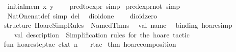 \begin{isabellebody}
{}\ {}initial{}mem\ x\ y\ {}\ {}\ {}{}\isanewline
\isanewline
{}\isamarkupfalse%
\ pred{}to{}expr\ {}simp{}\isanewline
{}\isamarkupfalse%
\ pred{}expr{}not\ {}simp{}\isanewline
{}\isamarkupfalse%
\ Nat{}One{}nat{}def\ {}simp\ del{}\isanewline
\isanewline
{}\isamarkupfalse%
\isanewline
\ \ dioid{}one\ {}{}{}{}{}{}\ \isanewline
\ \ dioid{}zero\ {}{}{}{}{}{}\isanewline
%
\isadelimML
\isanewline
%
\endisadelimML
%
\isatagML
{}\isamarkupfalse%
\ {}\isanewline
\isanewline
structure\ HoareSimpRules\ {}\ Named{}Thms\isanewline
\ \ {}val\ name\ {}\ %
\isaantiq
binding\ {}hoare{}simp{}{}%
\endisaantiq
\isanewline
\ \ \ val\ description\ {}\ {}Simplification\ rules\ for\ the\ hoare\ tactic{}{}\isanewline
\isanewline
fun\ hoare{}step{}tac\ ctxt\ n\ {}\isanewline
\ \ rtac\ %
\isaantiq
thm\ hoare{}composition{}%

\end{isabellebody}
